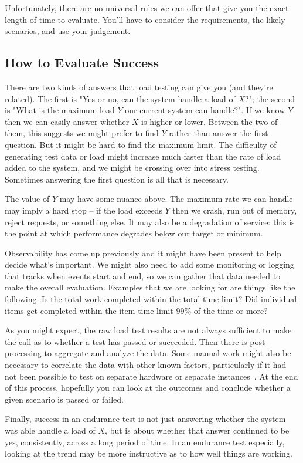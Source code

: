Unfortunately, there are no universal rules we can offer that give you the exact length of time to evaluate. You'll have to consider the requirements, the likely scenarios, and use your judgement.

\subsection*{How to Evaluate Success}
There are two kinds of answers that load testing can give you (and they're related). The first is "Yes or no, can the system handle a load of $X$?"; the second is "What is the maximum load $Y$ our current system can handle?". If we know $Y$ then we can easily answer whether $X$ is higher or lower. Between the two of them, this suggests we might prefer to find $Y$ rather than answer the first question. But it might be hard to find the maximum limit. The difficulty of generating test data or load might increase much faster than the rate of load added to the system, and we might be crossing over into stress testing. Sometimes answering the first question is all that is necessary.

The value of $Y$ may have some nuance above. The maximum rate we can handle may imply a hard stop -- if the load exceeds $Y$ then we crash, run out of memory, reject requests, or something else. It may also be a degradation of service: this is the point at which performance degrades below our target or minimum. 

Observability has come up previously and it might have been present to help decide what's important. We might also need to add some monitoring or logging that tracks when events start and end, so we can gather that data needed to make the overall evaluation. Examples that we are looking for are things like the following. Is the total work completed within the total time limit? Did individual items get completed within the item time limit 99\% of the time or more? 

As you might expect, the raw load test results are not always sufficient to make the call as to whether a test has passed or succeeded. Then there is post-processing to aggregate and analyze the data. Some manual work might also be necessary to correlate the data with other known factors, particularly if it had not been possible to test on separate hardware or separate instances~\cite{hitchhiking}. At the end of this process, hopefully you can look at the outcomes and conclude whether a given scenario is passed or failed.

Finally, success in an endurance test is not just answering whether the system was able handle a load of $X$, but is about whether that answer continued to be yes, consistently, across a long period of time. In an endurance test especially, looking at the trend may be more instructive as to how well things are working.


